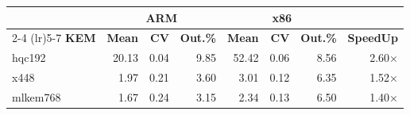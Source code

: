 \begin{table}[!ht]
\begin{tabular}{lrrr|rrr|r}
 \toprule
& \multicolumn{3}{c}{\bfseries ARM} & \multicolumn{3}{c}{\bfseries x86} &\\
\cmidrule(lr){2-4} \cmidrule(lr){5-7}
\textbf{KEM} & \textbf{Mean} & \textbf{CV} & \textbf{Out.\%} & \textbf{Mean} & \textbf{CV} & \textbf{Out.\%} & \textbf{SpeedUp}\\
\midrule
hqc192 & 20.13 & 0.04 & 9.85 & 52.42 & 0.06 & 8.56 & 2.60× \\
x448 & 1.97 & 0.21 & 3.60 & 3.01 & 0.12 & 6.35 & 1.52× \\
mlkem768 & 1.67 & 0.24 & 3.15 & 2.34 & 0.13 & 6.50 & 1.40× \\
\bottomrule
\end{tabular}
\end{table}
